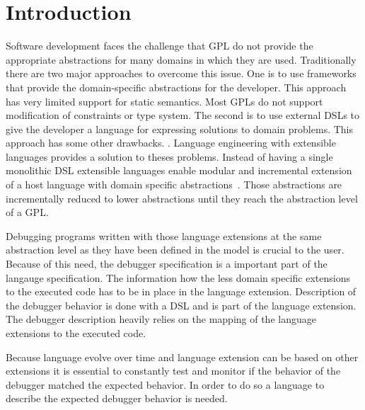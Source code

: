 \section{Introduction}

Software development faces the challenge that \ac{GPL}
do not provide the appropriate abstractions for many domains 
in which they are used. Traditionally there are two major 
approaches to overcome this issue. One is to use frameworks 
that provide the domain-specific abstractions for the developer. 
This approach has very limited support for static semantics. 
Most \acp{GPL} do not support modification of constraints or type system. 
The second is to use external \acp{DSL} to give the developer a 
language for expressing solutions to domain problems. This approach 
has some other drawbacks. .
Language engineering with extensible languages provides a 
solution to theses problems. Instead of having a single 
monolithic \ac{DSL} extensible languages enable modular and 
incremental extension of a host language with domain specific 
abstractions~\cite{Voelter2011}. Those abstractions are incrementally
reduced to lower abstractions until they reach the 
abstraction level of a \ac{GPL}.

Debugging programs written with those language extensions at the same 
abstraction level as they have been defined in the model 
is crucial to the user. Because of this need, the debugger 
specification is a important part of the langauge specification. The 
information how the less domain specific extensions to the 
executed code has to be in place in the language extension. 
Description of the debugger behavior is done with a \ac{DSL} 
and is part of the language extension. The debugger description 
heavily relies on the mapping of the language extensions to the executed code.

Because language evolve over time and language extension can 
be based on other extensions it is essential to constantly 
test and monitor if the behavior of the debugger matched the 
expected behavior. In order to do so a language to describe 
the expected debugger behavior is needed.